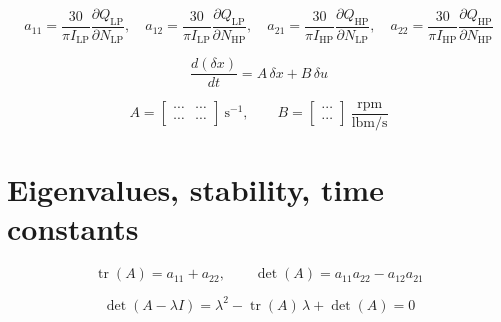\documentclass[11pt,a4paper]{article}
\begin{document}
\begin{equation}
  a_{11} = \frac{30}{\pi I_{\mathrm{LP}}}\frac{\partial Q_{\mathrm{LP}}}{\partial N_{\mathrm{LP}}},\quad
  a_{12} = \frac{30}{\pi I_{\mathrm{LP}}}\frac{\partial Q_{\mathrm{LP}}}{\partial N_{\mathrm{HP}}},\quad
  a_{21} = \frac{30}{\pi I_{\mathrm{HP}}}\frac{\partial Q_{\mathrm{HP}}}{\partial N_{\mathrm{LP}}},\quad
  a_{22} = \frac{30}{\pi I_{\mathrm{HP}}}\frac{\partial Q_{\mathrm{HP}}}{\partial N_{\mathrm{HP}}}
  \label{eq:jacobian-torque}
\end{equation}

\begin{equation}
  \frac{d(\delta x)}{dt} = A\,\delta x + B\,\delta u
  \label{eq:linear-system}
\end{equation}

\begin{equation}
  A = \begin{bmatrix} \cdots & \cdots \\ \cdots & \cdots \end{bmatrix}\ \mathrm{s}^{-1},
  \qquad
  B = \begin{bmatrix} \cdots \\ \cdots \end{bmatrix}\ \frac{\mathrm{rpm}}{\mathrm{lbm/s}}
  \label{eq:numeric-ab}
\end{equation}

\section{Eigenvalues, stability, time constants}

\begin{equation}
  \operatorname{tr}(A) = a_{11} + a_{22}, \qquad \det(A) = a_{11}a_{22} - a_{12}a_{21}
  \label{eq:trace-det}
\end{equation}

\begin{equation}
  \det(A - \lambda I) = \lambda^{2} - \operatorname{tr}(A)\,\lambda + \det(A) = 0
  \label{eq:characteristic}
\end{equation}
\end{document}
